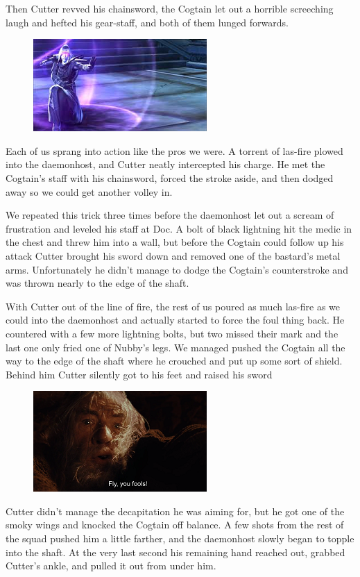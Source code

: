 Then Cutter revved his chainsword, the Cogtain let out a horrible screeching laugh and hefted his gear-staff, and both of them lunged forwards.

\begin{figure}
	\begin{center}
		\includegraphics[width=\figwidth]{pics/7/47.png}
	\end{center}
\end{figure}
Each of us sprang into action like the pros we were. 
A torrent of las-fire plowed into the daemonhost, and Cutter neatly intercepted his charge. 
He met the Cogtain’s staff with his chainsword, forced the stroke aside, and then dodged away so we could get another volley in.

We repeated this trick three times before the daemonhost let out a scream of frustration and leveled his staff at Doc. 
A bolt of black lightning hit the medic in the chest and threw him into a wall, but before the Cogtain could follow up his attack Cutter brought his sword down and removed one of the bastard’s metal arms. 
Unfortunately he didn’t manage to dodge the Cogtain’s counterstroke and was thrown nearly to the edge of the shaft.

With Cutter out of the line of fire, the rest of us poured as much las-fire as we could into the daemonhost and actually started to force the foul thing back. 
He countered with a few more lightning bolts, but two missed their mark and the last one only fried one of Nubby’s legs. 
We managed pushed the Cogtain all the way to the edge of the shaft where he crouched and put up some sort of shield. 
Behind him Cutter silently got to his feet and raised his sword

\begin{figure}
	\begin{center}
		\includegraphics[width=\figwidth]{pics/7/48.png}
	\end{center}
\end{figure}
Cutter didn’t manage the decapitation he was aiming for, but he got one of the smoky wings and knocked the Cogtain off balance. 
A few shots from the rest of the squad pushed him a little farther, and the daemonhost slowly began to topple into the shaft. 
At the very last second his remaining hand reached out, grabbed Cutter’s ankle, and pulled it out from under him.

